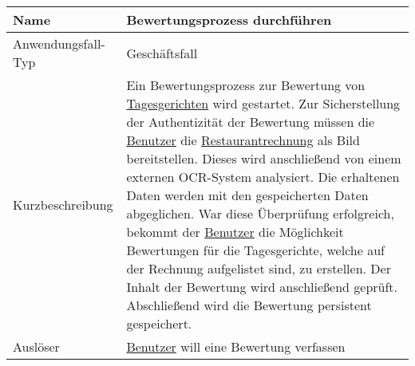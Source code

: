 \begin{table}[H]
    \centering
    \label{bewertungsprozessDurchfuehren}
    \begin{tabularx}{\textwidth}{| l | X |}
        \hline
        Name               & Bewertungsprozess durchführen                                                                                                                                                                                                                                                                                                                                                                                                                                                                                                                                                                                                                                                                                                     \\
        \hline
        Anwendungsfall-Typ & Geschäftsfall                                                                                                                                                                                                                                                                                                                                                                                                                                                                                                                                                                                                                                                                                                                     \\
        \hline
        Kurzbeschreibung   & Ein Bewertungsprozess zur Bewertung von \hyperref[gls:tagesgericht]{Tagesgerichten} wird gestartet. Zur Sicherstellung der Authentizität der Bewertung müssen die \hyperref[gls:nutzer]{Benutzer} die \hyperref[gls:restaurantRechnung]{Restaurantrechnung} als Bild bereitstellen. Dieses wird anschließend von einem externen OCR-System analysiert. Die erhaltenen Daten werden mit den gespeicherten Daten abgeglichen. War diese Überprüfung erfolgreich, bekommt der \hyperref[gls:nutzer]{Benutzer} die Möglichkeit Bewertungen für die Tagesgerichte, welche auf der Rechnung aufgelistet sind, zu erstellen. Der Inhalt der Bewertung wird anschließend geprüft. Abschließend wird die Bewertung persistent gespeichert. \\
        \hline
        Auslöser           & \hyperref[gls:nutzer]{Benutzer} will eine Bewertung verfassen                                                                                                                                                                                                                                                                                                                                                                                                                                                                                                                                                                                                                                                                     \\

\end{tabularx}
\end{table}

